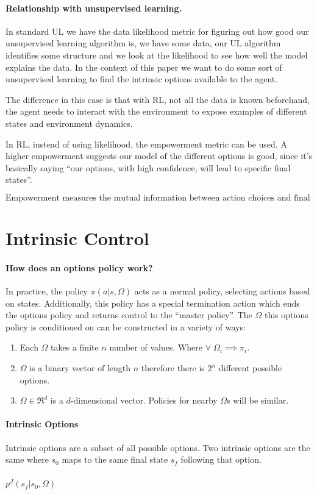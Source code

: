 \documentclass{article}
\begin{document}
\paragraph{Relationship with unsupervised learning.} In standard UL we have the data likelihood metric for figuring out how good our unsupervised learning algorithm is, we have some data, our UL algorithm identifies some structure and we look at the likelihood to see how well the model explains the data. In the context of this paper we want to do some sort of unsupervised learning to find the intrinsic options available to the agent.


The difference in this case is that with RL, not all the data is known beforehand, the agent needs to interact with the environment to expose examples of different states and environment dynamics.


In RL, instead of using likelihood, the empowerment metric can be used. A higher empowerment suggests our model of the different options is good, since it's basically saying ``our options, with high confidence, will lead to specific final states''.

\begin{equation}
  \label{eq:2}
  \text{Empowerment measures the mutual information between action choices and final states}
\end{equation}

\section{Intrinsic Control}

\paragraph{How does an options policy work?} In practice, the policy \(\pi(a|s,\Omega)\) acts as a normal policy, selecting actions based on states. Additionally, this policy has a special termination action which ends the options policy and returns control to the ``master policy''. The \(\Omega\) this options policy is conditioned on can be constructed in a variety of ways:

\begin{enumerate}
  \item Each \(\Omega\) takes a finite \(n\) number of values. Where \(\forall \; \Omega_{i} \implies \pi_{i}\).
  \item \(\Omega\) is a binary vector of length \(n\) therefore there is \(2^{n}\) different possible options.
    \item \(\Omega \in \Re^{d}\) is a \(d\)-dimensional vector. Policies for nearby \(\Omega\)s will be similar.
\end{enumerate}

\paragraph{Intrinsic Options} Intrinsic options are a subset of all possible options. Two intrinsic options are the same where \(s_{0}\) maps to the same final state \(s_{f}\) following that option.

\paragraph{\(p^{J}(s_{f}|s_{0}, \Omega)\)}
\end{document}
